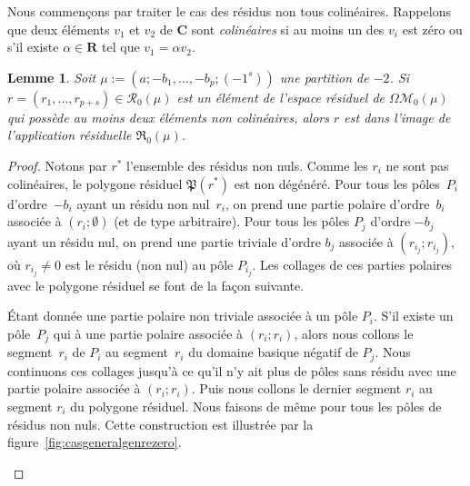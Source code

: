 \documentclass[JEP,XML,SOM,Unicode,francais,NoFloatCountersInSection,published]{cedram}
\let\mathcal\mathscr
\newcommand{\RR}{\mathbf{R}}
\newcommand{\CC}{\mathbf{C}}
\newcommand{\appres}[1][g]{\mathfrak{R}_{#1}}
\newcommand{\espres}[1][g]{\mathcal{R}_{#1}}
\newcommand{\omoduli}[1][g]{{\Omega\mathcal M}_{\!#1}}
\newtheorem{lem}[thm]{Lemme}
\theoremstyle{definition}
\begin{document}
Nous commençons par traiter le cas des résidus non tous colinéaires. Rappelons que deux éléments $v_{1}$ et $v_{2}$ de $\CC$ sont \emph{colinéaires} si au moins un des $v_{i}$ est zéro ou s'il existe $\alpha\in \RR$ tel que $v_{1} = \alpha v_{2}$.
\begin{lem}\label{lem:gzerogen1}
Soit $\mu:=(a;-b_{1},\dots,-b_{p};(-1^{s}))$ une partition de $-2$. Si $r=(r_{1}, \dots , r_{p+s})\in\espres[0](\mu)$ est un élément de l'espace résiduel de $\omoduli[0](\mu)$ qui possède au moins deux éléments non colinéaires, alors $r$ est dans l’image de l'application résiduelle $\appres[0](\mu)$.
\end{lem}

\begin{proof}
Notons par $r^{\ast}$ l'ensemble des résidus non nuls.
Comme les $r_{i}$ ne sont pas colinéaires, le polygone résiduel $\mathfrak{P}(r^{\ast})$ est non dégénéré. Pour tous les pôles~$P_{i}$ d'ordre~$-b_{i}$ ayant un résidu non nul~$r_{i}$, on prend une partie polaire d'ordre~$b_{i}$ associée à $(r_{i};\emptyset)$ (et de type arbitraire). Pour tous les pôles $P_{j}$ d'ordre $-b_{j}$ ayant un résidu nul, on prend une partie triviale d'ordre $b_{j}$ associée à $(r_{i_{j}};r_{i_{j}})$, où $r_{i_{j}}\neq0$ est le résidu (non nul) au pôle $P_{i_{j}}$. Les collages de ces parties polaires avec le polygone résiduel se font de la façon suivante.

Étant donnée une partie polaire non triviale associée à un pôle $P_{i}$. S'il existe un pôle~$P_{j}$ qui à une partie polaire associée à $(r_{i};r_{i})$, alors nous collons le segment~$r_{i}$ de $P_{i}$ au segment~$r_{i}$ du domaine basique négatif de $P_{j}$. Nous continuons ces collages jusqu'à ce qu'il n'y ait plus de pôles sans résidu avec une partie polaire associée à $(r_{i};r_{i})$. Puis nous collons le dernier segment $r_{i}$ au segment $r_{i}$ du polygone résiduel. Nous faisons de même pour tous les pôles de résidus non nuls. Cette construction est illustrée par la figure~\ref{fig:casgeneralgenrezero}.

\begin{figure}[htb]
\center
{}
\end{figure}
\end{proof}
\end{document}
